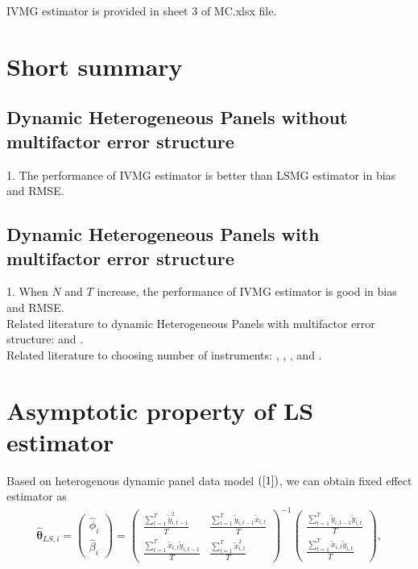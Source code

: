 \documentclass[12pt,a4paper,hyperref]{article}
\begin{document}
IVMG estimator is provided in sheet 3 of MC.xlsx file. \\

\section{Short summary}
\subsection{Dynamic Heterogeneous Panels without multifactor error structure}
1. The performance of IVMG estimator is better than LSMG estimator in bias and RMSE.


\subsection{Dynamic Heterogeneous Panels with multifactor error structure}
1. When $N$ and $T$ increase, the performance of IVMG estimator is good in bias and RMSE. \\
Related literature to dynamic Heterogeneous Panels with multifactor error structure: \citet{Chudik:2015} and \citet{Norkute:2019}.\\
Related literature to choosing number of instruments: \citet{Stephen:2001}, \citet{Swanson:2005}, \citet{Marine:2012}, \citet{Bai:2010} and \citet{Kang:2019}.


\newpage
\appendix
\appendixpage
\section{Asymptotic property of LS estimator}


Based on heterogenous dynamic panel data model $(\ref{1})$, we can obtain fixed effect estimator as
\begin{align}
\hat{\boldsymbol{\theta}}_{LS,i}=
\begin{pmatrix}
\hat{\phi}_{i} \\
\hat{\beta}_{i}
\end{pmatrix}=
\begin{pmatrix}
\frac{\sum^{T}_{t=1}\tilde{y}^{2}_{i,t-1}}{T} & \frac{\sum^{T}_{t=1}\tilde{y}_{i,t-1}\tilde{x}_{i,t}}{T} \\
\frac{\sum^{T}_{t=1}\tilde{x}_{i,t}\tilde{y}_{i,t-1}}{T} &  \frac{\sum^{T}_{t=1}\tilde{x}_{i,t}^{2}}{T}
\end{pmatrix}^{-1}
\begin{pmatrix}
\frac{\sum^{T}_{t=1}\tilde{y}_{i,t-1}\tilde{y}_{i,t}}{T} \\
\frac{\sum^{T}_{t=1}\tilde{x}_{i,t}\tilde{y}_{i,t}}{T}
\end{pmatrix},
\end{align}
\end{document}
